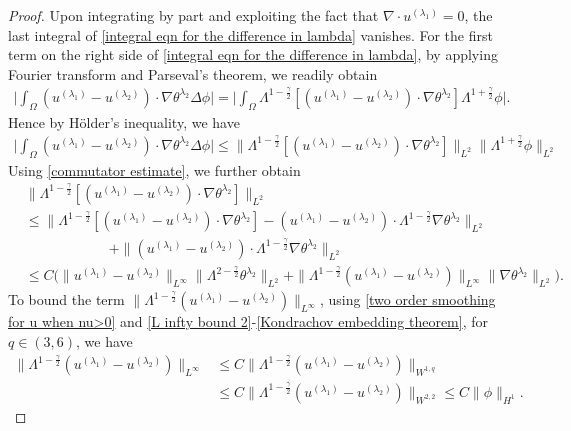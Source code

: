 \documentclass[reqno]{amsart}%
\theoremstyle{definition}
\theoremstyle{remark}
\numberwithin{equation}{section}
\newcommand{\1}{\mathbf{1}}
\newcommand{\intox}{\int_{\Omega}}
\numberwithin{equation}{section}
\numberwithin{theorem}{section}
\numberwithin{figure}{section}
\begin{document}
\begin{proof}
Upon integrating by part and exploiting the fact that $\nabla\cdot u^{(\lambda_1)}=0$, the last integral of \eqref{integral eqn for the difference in lambda} vanishes. For the first term on the right side of \eqref{integral eqn for the difference in lambda}, by applying Fourier transform and Parseval's theorem, we readily obtain
\begin{align*}
\Big|\intox (u^{(\lambda_1)}-u^{(\lambda_2)})\cdot\nabla\theta^{\lambda_2}\Delta \phi\Big|=\Big|\intox \Lambda^{1-\frac{\gamma}{2}}[(u^{(\lambda_1)}-u^{(\lambda_2)})\cdot\nabla\theta^{\lambda_2}]\Lambda^{1+\frac{\gamma}{2}} \phi\Big|.
\end{align*}
Hence by H\"{o}lder's inequality, we have
\begin{align*}
\Big|\intox (u^{(\lambda_1)}-u^{(\lambda_2)})\cdot\nabla\theta^{\lambda_2}\Delta \phi\Big|\le\|\Lambda^{1-\frac{\gamma}{2}}[(u^{(\lambda_1)}-u^{(\lambda_2)})\cdot\nabla\theta^{\lambda_2}]\|_{L^2}\|\Lambda^{1+\frac{\gamma}{2}} \phi\|_{L^2}
\end{align*}
Using \eqref{commutator estimate}, we further obtain
\begin{align*}
&\|\Lambda^{1-\frac{\gamma}{2}}[(u^{(\lambda_1)}-u^{(\lambda_2)})\cdot\nabla\theta^{\lambda_2}]\|_{L^2}\\
&\le\|\Lambda^{1-\frac{\gamma}{2}}[(u^{(\lambda_1)}-u^{(\lambda_2)})\cdot\nabla\theta^{\lambda_2}]-(u^{(\lambda_1)}-u^{(\lambda_2)})\cdot\Lambda^{1-\frac{\gamma}{2}}\nabla\theta^{\lambda_2}\|_{L^2}\\
&\qquad\qquad\qquad+\|(u^{(\lambda_1)}-u^{(\lambda_2)})\cdot\Lambda^{1-\frac{\gamma}{2}}\nabla\theta^{\lambda_2}\|_{L^2}\\
&\le C\Big(\|u^{(\lambda_1)}-u^{(\lambda_2)}\|_{L^\infty}\|\Lambda^{2-\frac{\gamma}{2}}\theta^{\lambda_2}\|_{L^2}+\|\Lambda^{1-\frac{\gamma}{2}}(u^{(\lambda_1)}-u^{(\lambda_2)})\|_{L^\infty}\|\nabla\theta^{\lambda_2}\|_{L^2}\Big).
\end{align*}
To bound the term $\|\Lambda^{1-\frac{\gamma}{2}}(u^{(\lambda_1)}-u^{(\lambda_2)})\|_{L^\infty}$, using \eqref{two order smoothing for u when nu>0} and \eqref{L infty bound 2}-\eqref{Kondrachov embedding theorem}, for $q\in(3,6)$, we have
\begin{align*}
\|\Lambda^{1-\frac{\gamma}{2}}(u^{(\lambda_1)}-u^{(\lambda_2)})\|_{L^\infty}&\le C\|\Lambda^{1-\frac{\gamma}{2}}(u^{(\lambda_1)}-u^{(\lambda_2)})\|_{W^{1,q}}\\
&\le C\|\Lambda^{1-\frac{\gamma}{2}}(u^{(\lambda_1)}-u^{(\lambda_2)})\|_{W^{2,2}}\le C\|\phi\|_{H^1}.

\end{align*}
\end{proof}
\end{document}
